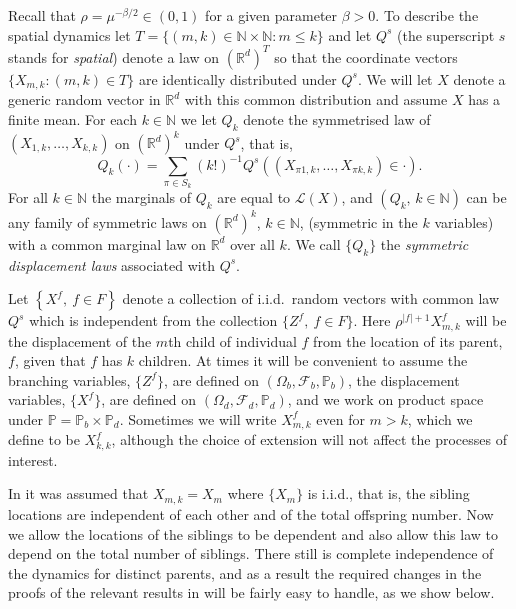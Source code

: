 \documentclass[12pt]{article}
\numberwithin{theorem}{section}
\theoremstyle{def}
\numberwithin{equation}{section}
\renewcommand{\P}{\mathbb{P}}
\newcommand{\R}{\mathbb{R}}
\newcommand{\N}{\mathbb{N}}
\newcommand{\cF}{\mathcal F}
\newcommand{\cL}{\mathcal{L}}
\begin{document}
Recall that $\rho=\mu^{-\beta/2}\in(0,1)$ for a given parameter $\beta>0$.  
To describe the spatial dynamics let $T=\{(m,k)\in\N\times\N:m\le k\}$ and let $Q^s$ (the superscript $s$ stands for \emph{spatial}) denote a law on $(\R^d)^T$ so that the coordinate vectors $\{X_{m,k}:(m,k)\in T\}$ are identically distributed under $Q^s$. 
We will let $X$ denote a generic random vector in $\R^d$ with this common distribution and assume $X$ has a finite mean.
 For each $k\in\N$ we let $Q_k$ denote the symmetrised law of $(X_{1,k},\dots,X_{k,k})$ on $(\R^d)^k$ under $Q^s$, that is,
\begin{equation}\label{eq:def symmetric displacement laws}
Q_k(\cdot)=\sum_{\pi\in S_k}(k!)^{-1}Q^s((X_{\pi 1,k},\dots,X_{\pi k,k})\in\cdot).
\end{equation}
For all $k\in \N$ the marginals of $Q_k$ are equal to $\cL(X)$, and $(Q_k, \, k\in\N)$ can be any family of symmetric laws on $(\R^d)^k$, $k\in\N$, (symmetric in the $k$ variables) with a common marginal law on $\R^d$ over all $k$. 
We call $\{Q_k\}$ the \emph{symmetric displacement laws} associated with $Q^s$.


Let $\left\lbrace X^f, \ f\in F\right\rbrace$ denote a collection of i.i.d.\ random vectors with common law $Q^s$ which is independent from the collection $\lbrace Z^f, \ f\in F\rbrace$.   
Here $\rho^{|f|+1}X^f_{m,k}$ will be the displacement of the $m$th child of individual $f$ from the location of its parent, $f$, given that $f$ has $k$ children. 
At times it will be convenient to assume the branching variables, $\{Z^f\}$, are defined on $(\Omega_b,\cF_b,\P_b)$, the displacement variables, $\{X^f\}$, are defined on $(\Omega_d,\cF_d,\P_d)$, and we work on product space under $\P=\P_b\times\P_d$. Sometimes we will write $X^f_{m,k}$ even for $m>k$, which we define to be $X^f_{k,k}$, although the choice of extension will not affect the processes of interest.


In \cite{ADHP} it was assumed that $X_{m,k}=X_m$ where $\{X_m\}$ is i.i.d., that is, the sibling locations are independent of each other and  of the total offspring number.  
Now we allow the locations of the siblings to be dependent and also allow this law to depend on the total number of siblings. 
There still is 
complete independence of the dynamics for distinct parents, and as a result the required changes in the proofs of the relevant results in \cite{ADHP} will be fairly easy to handle, as we show below. 
\end{document}
